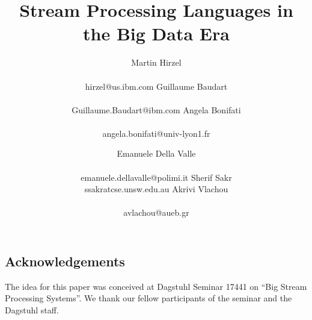 \documentclass[preprint]{sig-alternate-10pt}
\begin{document}
\title{Stream Processing Languages in the Big Data Era}

\newcommand*{\emailn}[1]{\textsf{\normalsize #1}}

\author{
\alignauthor
Martin Hirzel\\
  \\
  \emailn{hirzel@us.ibm.com}
\alignauthor
Guillaume Baudart\\
  \\
  \emailn{Guillaume.Baudart@ibm.com}
\alignauthor
Angela Bonifati\\
  \\
  \emailn{angela.bonifati@univ-lyon1.fr}
\and
\alignauthor
Emanuele Della Valle\\
  \\
  \emailn{emanuele.dellavalle@polimi.it}
\alignauthor
Sherif Sakr\\
  \emailn{ssakratcse.unsw.edu.au}
\alignauthor
Akrivi Vlachou\\
  \\
  \emailn{avlachou@aueb.gr}}

\maketitle

\begin{abstract}
  
\end{abstract}






\subsection*{Acknowledgements}

The idea for this paper was conceived at Dagstuhl Seminar 17441 on
``Big Stream Processing Systems''. We thank our fellow participants of
the seminar and the Dagstuhl staff.


\balance

\end{document}
